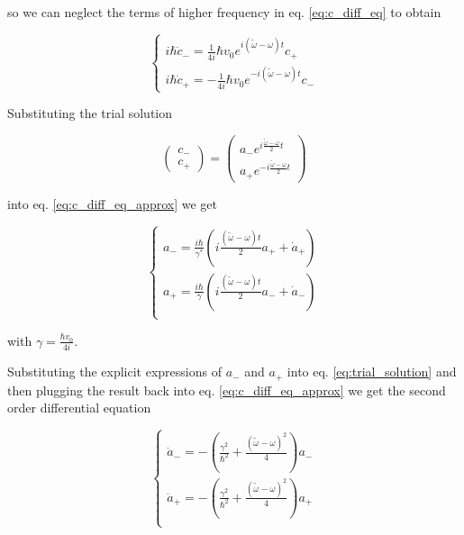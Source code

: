 \documentclass{article}
\begin{document}
so we can neglect the terms of higher frequency in eq. \eqref{eq:c_diff_eq} to obtain

\begin{equation}
\label{eq:c_diff_eq_approx}
  \begin{cases} 
      i\hbar \dot{c}_- = \frac{1}{4i} \hbar v_0 e^{i(\tilde{\omega}-\omega)t} c_+ \\
      i\hbar \dot{c}_+ = - \frac{1}{4i} \hbar v_0 e^{-i(\tilde{\omega}-\omega)t} c_-
   \end{cases}
\end{equation}

Substituting the trial solution

\begin{equation}
\label{eq:trial_solution}
  \begin{pmatrix}
    c_- \\
    c_+
  \end{pmatrix}
=
  \begin{pmatrix}
    a_- e^{i\frac{\tilde{\omega} - \omega}{2}t} \\
    a_+ e^{-i\frac{\tilde{\omega} - \omega}{2}t}
  \end{pmatrix}
\end{equation}

into eq. \eqref{eq:c_diff_eq_approx} we get

\begin{equation}
  \begin{cases}
    a_- = \frac{i\hbar}{\gamma^*} \left( i\frac{(\tilde{\omega}-\omega)t}{2} a_+ + \dot{a}_+ \right) \\
    a_+ = \frac{i\hbar}{\gamma} \left( i\frac{(\tilde{\omega}-\omega)t}{2} a_- + \dot{a}_- \right) \\
  \end{cases}
\end{equation}

with \( \gamma = \frac{\hbar v_0}{4i} \).

Substituting the explicit expressions of \( a_- \) and \( a_+ \) into eq. \eqref{eq:trial_solution} and then plugging the result back into eq. \eqref{eq:c_diff_eq_approx} we get the second order differential equation

\begin{equation}
  \begin{cases}
    \ddot{a}_- = - \left( \frac{\gamma^2}{\hbar^2} + \frac{(\tilde{\omega}-\omega)^2}{4} \right) a_- \\
    \ddot{a}_+ = - \left( \frac{\gamma^2}{\hbar^2} + \frac{(\tilde{\omega}-\omega)^2}{4} \right) a_+ \\
  \end{cases}
\end{equation}
\end{document}
